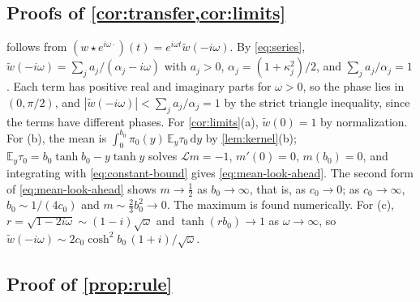 \documentclass[11pt]{article}
\theoremstyle{definition}
\theoremstyle{remark}
\newcommand{\E}{\mathbb{E}}
\newcommand{\dd}{\,\mathrm{d}}
\newcommand{\Lop}{\mathcal{L}}
\begin{document}
\subsection{Proofs of \texorpdfstring{\cref{cor:transfer,cor:limits}}{Corollaries  and }}

 follows from $(w \star e^{i\omega\cdot})(t) = e^{i\omega t}\tilde w(-i\omega)$.
By \eqref{eq:series}, $\tilde w(-i\omega) = \sum_j a_j/(\alpha_j - i\omega)$ with $a_j > 0$,
$\alpha_j = (1 + \kappa_j^2)/2$, and $\sum_j a_j/\alpha_j = 1$. Each term has positive real and
imaginary parts for $\omega > 0$, so the phase lies in $(0, \pi/2)$, and
$|\tilde w(-i\omega)| < \sum_j a_j/\alpha_j = 1$ by the strict triangle inequality, since the terms
have different phases. For \cref{cor:limits}(a), $\tilde w(0) = 1$ by normalization. For (b), the
mean is $\int_0^{b_0}\pi_0(y)\,\E_y\tau_0\dd y$ by \cref{lem:kernel}(b); $\E_y\tau_0 =
b_0\tanh b_0 - y\tanh y$ solves $\Lop m = -1$, $m'(0) = 0$, $m(b_0) = 0$, and integrating with
\eqref{eq:constant-bound} gives \eqref{eq:mean-look-ahead}. The second form of
\eqref{eq:mean-look-ahead} shows $m \to \tfrac12$ as $b_0 \to \infty$, that is, as $c_0 \to 0$; as
$c_0 \to \infty$, $b_0 \sim 1/(4c_0)$ and $m \sim \tfrac23 b_0^2 \to 0$. The maximum is found
numerically. For (c), $r = \sqrt{1 - 2i\omega} \sim (1 - i)\sqrt\omega$ and $\tanh(rb_0) \to 1$ as
$\omega \to \infty$, so $\tilde w(-i\omega) \sim 2c_0\cosh^2 b_0\,(1 + i)/\sqrt\omega$.

\subsection{Proof of \texorpdfstring{\cref{prop:rule}}{Proposition }}
\end{document}
